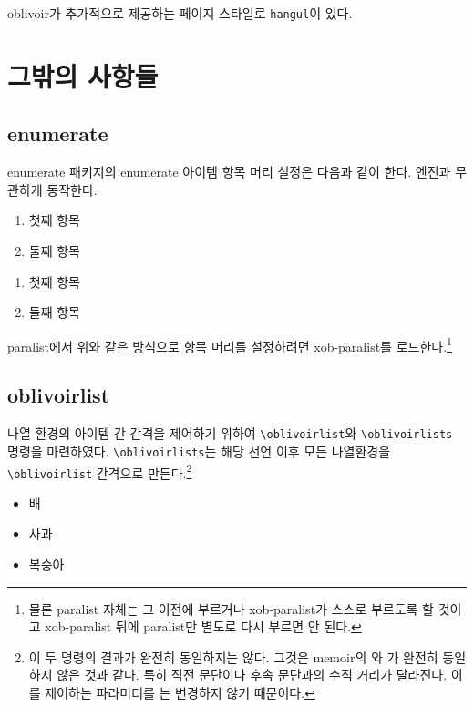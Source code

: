 \documentclass[
	12pt,
	a4paper,
	kosection,
	footnote,
	microtype,
	figtabcapt,
]{oblivoir}
\begin{document}
oblivoir가 추가적으로 제공하는 페이지 스타일로 \texttt{hangul}이 있다.
\begin{boxedverbatim}
\pagestyle{hangul}
\end{boxedverbatim}


\section{그밖의 사항들}

\subsection{enumerate}

enumerate 패키지의 enumerate 아이템 항목 머리 설정은
다음과 같이 한다. 엔진과 무관하게 동작한다.
\begin{boxedverbatim}
\begin{enumerate}[(㉠)] \tightlist
\item 첫째 항목
\item 둘째 항목
\end{enumerate}
\end{boxedverbatim}
\begin{enumerate}[(㉠)] \tightlist
\item 첫째 항목
\item 둘째 항목
\end{enumerate}
paralist에서 위와 같은 방식으로 항목 머리를 설정하려면 
xob-paralist를 로드한다.\footnote{%
	물론 paralist 자체는 그 이전에 부르거나
	xob-paralist가 스스로 부르도록 할 것이고 xob-paralist 뒤에
	paralist만 별도로 다시 부르면 안 된다.
}


\subsection{oblivoirlist}

나열 환경의 아이템 간 간격을 제어하기 위하여 \verb|\oblivoirlist|와 
\verb|\oblivoirlists| 명령을 마련하였다. \verb|\oblivoirlists|는
해당 선언 이후 모든 나열환경을 \verb|\oblivoirlist| 간격으로 만든다.\footnote{%
	이 두 명령의 결과가 완전히 동일하지는 않다. 그것은 memoir의 \cmd{\firmlist}와
	\cmd{\firmlists}가 완전히 동일하지 않은 것과 같다. 특히 직전 문단이나 후속 문단과의
	수직 거리가 달라진다. 이를 제어하는 파라미터를 는 변경하지
	않기 때문이다.}

\begin{itemize}\oblivoirlist
\item 배
\item 사과
\item 복숭아
\end{itemize}
\end{document}
